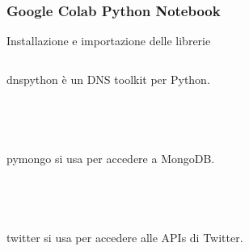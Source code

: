 \documentclass[xcolor=svgnames, aspectratio=169]{beamer}
\begin{document}
\subsubsection{Google Colab Python Notebook}

\begin{frame}{Installazione e importazione delle librerie}
    \fontsize{9pt}{9}\selectfont
    \begin{columns}[t]
        dnspython è un DNS toolkit per Python.\\~\\~\\~\\~\\
        
        pymongo si usa per accedere a MongoDB.\\~\\~\\~\\~\\
        
        twitter si usa per accedere alle APIs di Twitter.
        \vspace*{-32pt}
        \begin{figure}[H]
            \centering
            \noindent{}
        \end{figure}
    \end{columns}
\end{frame}

\end{document}
